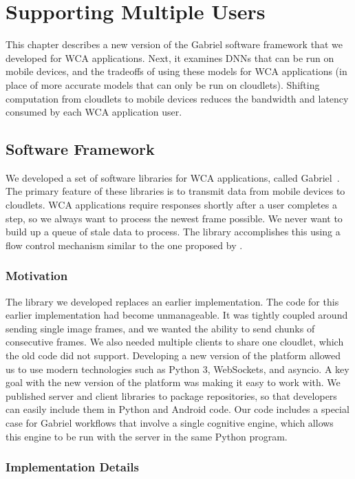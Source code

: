 \chapter{Supporting Multiple Users}

This chapter describes a new version of the Gabriel software framework that we
developed for WCA applications.
Next, it examines DNNs that can be run on mobile devices, and the tradeoffs of
using these models for WCA applications (in place of more accurate models that
can only be run on cloudlets).
Shifting computation from cloudlets to mobile devices reduces the bandwidth and
latency consumed by each WCA application user.

\section{Software Framework}

We developed a set of software libraries for WCA applications, called
Gabriel~\cite{gabriel_github}.
The primary feature of these libraries is to transmit data from mobile devices
to cloudlets.
WCA applications require responses shortly after a user completes a step, so
we always want to process the newest frame possible. We never want to build up
a queue of stale data to process. The library accomplishes this using a flow
control mechanism similar to the one proposed by \citet{ha2014}.

\subsection{Motivation}

The library we developed replaces an earlier implementation.
The code for this earlier implementation had become unmanageable.
It was tightly coupled around sending single image frames, and we
wanted the ability to send chunks of consecutive frames.
We also needed multiple clients to share one cloudlet, which the old code did
not support.
Developing a new version of the platform allowed us to use modern technologies
such as Python 3, WebSockets, and asyncio.
A key goal with the new version of the platform was making it easy to work with.
We published server and client libraries to package repositories, so that
developers can easily include them in Python and Android code.
Our code includes a special case for Gabriel workflows that involve a single
cognitive engine, which allows this engine to be run with the server in the same
Python program.

\subsection{Implementation Details}

